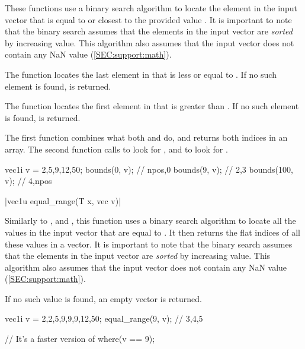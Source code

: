 These functions use a binary search algorithm to locate the element in the input vector  that is equal to or closest to the provided value . It is important to note that the binary search assumes that the elements in the input vector are \emph{sorted} by increasing value. This algorithm also assumes that the input vector does not contain any NaN value (\ref{SEC:support:math}).

The  function locates the last element in  that is less or equal to . If no such element is found,  is returned.

The  function locates the first element in  that is greater than . If no such element is found,  is returned.

The first  function combines what both  and  do, and returns both indices in an array. The second  function calls  to look for , and  to look for .

\begin{example}
\begin{cppcode}
vec1i v = {2,5,9,12,50};
bounds(0, v);   // {npos,0}
bounds(9, v);   // {2,3}
bounds(100, v); // {4,npos}
\end{cppcode}
\end{example}

\funcitem \cppinline|vec1u equal_range(T x, vec v)| 

Similarly to ,  and , this function uses a binary search algorithm to locate all the values in the input vector  that are equal to . It then returns the flat indices of all these values in a vector. It is important to note that the binary search assumes that the elements in the input vector are \emph{sorted} by increasing value. This algorithm also assumes that the input vector does not contain any NaN value (\ref{SEC:support:math}).

If no such value is found, an empty vector is returned.

\begin{example}
\begin{cppcode}
vec1i v = {2,2,5,9,9,9,12,50};
equal_range(9, v); // {3,4,5}

// It's a faster version of
where(v == 9);
\end{cppcode}
\end{example}

